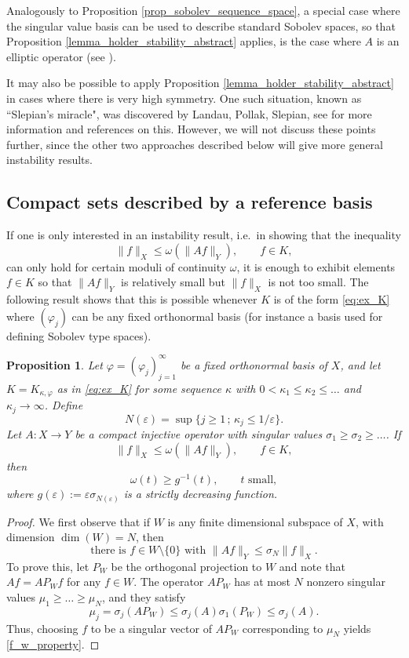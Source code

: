 \documentclass[12pt,twoside]{amsart}
\numberwithin{equation}{section}
\renewcommand{\leq}{\leqslant}
\renewcommand{\geq}{\geqslant}
\newtheorem{proposition}[theorem]{Proposition}
\newcommand{\norm}[1]{\lVert #1 \rVert}         %
\newcommand{\eps}{\varepsilon}
\begin{document}
\begin{appendix}
Analogously to Proposition \ref{prop_sobolev_sequence_space}, a special case where the singular value basis can be used to describe standard Sobolev spaces, so that Proposition \ref{lemma_holder_stability_abstract} applies, is the case where $A$ is an elliptic operator (see \cite[Section 7.10 in vol.\ II]{Taylor}). 

It may also be possible to apply Proposition \ref{lemma_holder_stability_abstract} in cases where there is very high symmetry. One such situation, known as ``Slepian's miracle", was discovered by  Landau, Pollak, Slepian, see \cite{SP61} for more information and references on this. However, we will not discuss these points further, since the other two approaches described below will give more general instability results.



\subsection{Compact sets described by a reference basis}

If one is only interested in an instability result, i.e.\ in showing that the inequality 
\[
\norm{f}_X \leq \omega(\norm{Af}_Y), \qquad f \in K,
\]
can only hold for certain moduli of continuity $\omega$, it is enough to exhibit elements $f \in K$ so that $\norm{Af}_Y$ is relatively small but $\norm{f}_X$ is not too small. The following result shows that this is possible whenever $K$ is of the form \eqref{eq:ex_K} where $(\varphi_j)$ can be any fixed orthonormal basis (for instance a basis used for defining Sobolev type spaces).

\begin{proposition} \label{lemma_ref_basis}
Let $\varphi = (\varphi_j)_{j=1}^{\infty}$ be a fixed orthonormal basis of $X$, and let $K = K_{\kappa,\varphi}$ as in \eqref{eq:ex_K} for some sequence $\kappa$ with $0 < \kappa_1 \leq \kappa_2 \leq \ldots$ and $\kappa_j \to \infty$. Define 
\[
N(\eps) = \sup \{ j \geq 1 \,;\, \kappa_j \leq 1/\eps \}.
\]
Let $A: X \to Y$ be a compact injective operator with singular values $\sigma_1 \geq \sigma_2 \geq \ldots$. If 
\[
\norm{f}_X \leq \omega(\norm{Af}_Y), \qquad f \in K,
\]
then 
\[
\omega(t) \geq g^{-1}(t), \qquad \text{$t$ small},
\]
where $g(\eps) := \eps \sigma_{N(\eps)}$ is a strictly decreasing function.
\end{proposition}
\begin{proof}
We first observe that if $W$ is any finite dimensional subspace of $X$, with dimension $\dim(W) = N$, then 
\begin{equation} \label{f_w_property}
\text{there is $f \in W \setminus \{ 0 \}$ with $\norm{Af}_Y \leq \sigma_N \norm{f}_X$}.
\end{equation}
To prove this, let $P_W$ be the orthogonal projection to $W$ and note that $Af = AP_{W} f$ for any $f \in W$. The operator $AP_W$ has at most $N$ nonzero singular values $\mu_1 \geq \ldots \geq \mu_N$, and they satisfy 
\[
\mu_j = \sigma_j(A P_W) \leq \sigma_j(A) \sigma_1(P_W) \leq \sigma_j(A).
\]
Thus, choosing $f$ to be a singular vector of $AP_W$ corresponding to $\mu_N$ yields \eqref{f_w_property}.


\end{proof}
\end{appendix}
\end{document}
